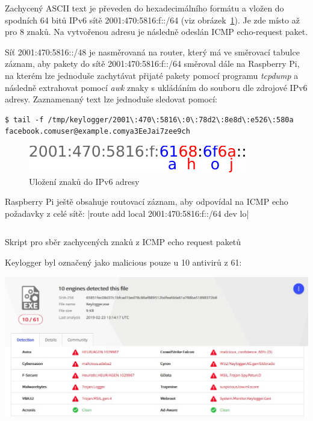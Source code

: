 \documentclass[12pt]{article}
\begin{document}
Zachycený ASCII text je převeden do hexadecimálního formátu a vložen do spodních 64 bitů IPv6 sítě 2001:470:5816:f::/64 (viz obrázek~\ref{fig:ip}). Je zde místo až pro 8 znaků.
Na vytvořenou adresu je následně odeslán ICMP echo-request paket.

Síť 2001:470:5816::/48 je nasměrovaná na router, který má ve směrovací tabulce záznam, aby pakety do sítě 2001:470:5816:f::/64 směroval dále na Raspberry Pi, na kterém lze jednoduše zachytávat přijaté pakety pomocí programu \textit{tcpdump} a následně extrahovat pomocí \textit{awk} znaky s ukládáním do souboru dle zdrojové IPv6 adresy.
Zaznamenaný text lze jednoduše sledovat pomocí:

\begin{verbatim}
$ tail -f /tmp/keylogger/2001\:470\:5816\:0\:78d2\:8e8d\:e526\:580a
facebook.comuser@example.comya3EeJai7zee9ch
\end{verbatim}



\begin{figure}
\centering
\includegraphics{ip.pdf}
\caption{Uložení znaků do IPv6 adresy}
\label{fig:ip}
\end{figure}


Raspberry Pi ještě obsahuje routovací záznam, aby odpovídal na ICMP echo požadavky z celé sítě: |route add local 2001:470:5816:f::/64 dev lo|

\begin{listing}[ht]
\inputminted{bash}{../capture.sh}
\caption{Skript pro sběr zachycených znaků z ICMP echo request paketů}
\end{listing}

Keylogger byl označený jako malicious pouze u 10 antivirů z 61:

\includegraphics[width=\textwidth]{virustotal}
\end{document}
